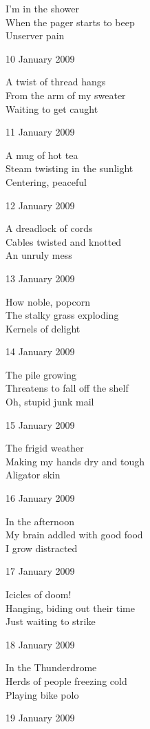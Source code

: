 \documentclass[12pt]{article}
\begin{document}
I'm in the shower \\
When the pager starts to beep \\
Unserver pain

10 January 2009

A twist of thread hangs \\
From the arm of my sweater \\
Waiting to get caught

\newpage

11 January 2009

A mug of hot tea \\
Steam twisting in the sunlight \\
Centering, peaceful

12 January 2009

A dreadlock of cords \\
Cables twisted and knotted \\
An unruly mess

13 January 2009

How noble, popcorn \\
The stalky grass exploding \\
Kernels of delight

14 January 2009

The pile growing \\
Threatens to fall off the shelf \\
Oh, stupid junk mail

15 January 2009

The frigid weather \\
Making my hands dry and tough \\
Aligator skin

16 January 2009

In the afternoon \\
My brain addled with good food \\
I grow distracted

17 January 2009

Icicles of doom! \\
Hanging, biding out their time \\
Just waiting to strike

\newpage

18 January 2009

In the Thunderdrome \\
Herds of people freezing cold \\
Playing bike polo

19 January 2009
\end{document}
